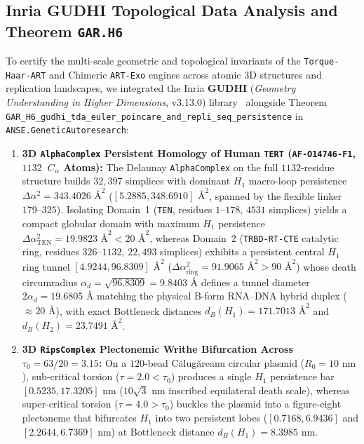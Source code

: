 \documentclass[11pt,a4paper]{article}
\theoremstyle{definition}
\begin{document}
\subsection{Inria GUDHI Topological Data Analysis and Theorem \texttt{GAR.H6}}
To certify the multi-scale geometric and topological invariants of the \texttt{Torque-Haar-ART} and Chimeric \texttt{ART-Exo} engines across atomic 3D structures and replication landscapes, we integrated the Inria \textbf{GUDHI} (\emph{Geometry Understanding in Higher Dimensions}, v3.13.0) library~\cite{gudhi2026} alongside Theorem \texttt{GAR\_H6\_gudhi\_tda\_euler\_poincare\_and\_repli\_seq\_persistence} in \texttt{ANSE.GeneticAutoresearch}:
\begin{enumerate}
  \item \textbf{3D \texttt{AlphaComplex} Persistent Homology of Human \texttt{TERT} (\texttt{AF-O14746-F1}, $1132$~$C_\alpha$ Atoms):} The Delaunay \texttt{AlphaComplex} on the full $1132$-residue structure builds $32{,}397$ simplices with dominant $H_1$ macro-loop persistence $\Delta\alpha^2 = 343.4026\text{ \AA}^2$ ($[5.2885, 348.6910]\text{ \AA}^2$, spanned by the flexible linker $179\text{--}325$). Isolating Domain~1 (\texttt{TEN}, residues $1\text{--}178$, $4531$ simplices) yields a compact globular domain with maximum $H_1$ persistence $\Delta\alpha_{\mathrm{TEN}}^2 = 19.9823\text{ \AA}^2 < 20\text{ \AA}^2$, whereas Domain~2 (\texttt{TRBD-RT-CTE} catalytic ring, residues $326\text{--}1132$, $22{,}493$ simplices) exhibits a persistent central $H_1$ ring tunnel $[4.9244, 96.8309]\text{ \AA}^2$ ($\Delta\alpha_{\mathrm{ring}}^2 = 91.9065\text{ \AA}^2 > 90\text{ \AA}^2$) whose death circumradius $\alpha_d = \sqrt{96.8309} = 9.8403\text{ \AA}$ defines a tunnel diameter $2\alpha_d = 19.6805\text{ \AA}$ matching the physical B-form RNA--DNA hybrid duplex ($\approx 20\text{ \AA}$), with exact Bottleneck distances $d_B(H_1) = 171.7013\text{ \AA}^2$ and $d_B(H_2) = 23.7491\text{ \AA}^2$.
  \item \textbf{3D \texttt{RipsComplex} Plectonemic Writhe Bifurcation Across $\tau_0 = 63/20 = 3.15$:} On a $120$-bead C\u{a}lug\u{a}reanu circular plasmid ($R_0 = 10\text{ nm}$), sub-critical torsion ($\tau = 2.0 < \tau_0$) produces a single $H_1$ persistence bar $[0.5235, 17.3205]\text{ nm}$ ($10\sqrt{3}\text{ nm}$ inscribed equilateral death scale), whereas super-critical torsion ($\tau = 4.0 > \tau_0$) buckles the plasmid into a figure-eight plectoneme that bifurcates $H_1$ into two persistent lobes ($[0.7168, 6.9436]$ and $[2.2644, 6.7369]\text{ nm}$) at Bottleneck distance $d_B(H_1) = 8.3985\text{ nm}$.

\end{enumerate}
\end{document}
